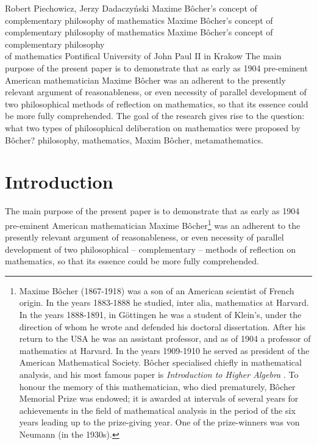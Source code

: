 \begin{artengenv}{Robert Piechowicz, Jerzy Dadaczyński}
	{Maxime Bôcher's concept of complementary philosophy of mathematics}
	{Maxime Bôcher's concept of complementary philosophy of mathematics}
	{Maxime Bôcher's concept of complementary philosophy\\of mathematics}
	{Pontifical University of John Paul II in Krakow}
	{The main purpose of the present paper is to demonstrate that as early as 1904 pre-eminent American mathematician Maxime Bôcher was an adherent to the presently relevant argument of reasonableness, or even necessity of parallel development of two philosophical methods of reflection on mathematics, so that its essence could be more fully comprehended. The goal of the research gives rise to the question: what two types of philosophical deliberation on mathematics were proposed by Bôcher?}
	{philosophy, mathematics, Maxim Bôcher, metamathematics.}
	




\section{Introduction}
The main purpose of the present paper is to demonstrate that as early as 1904 pre-eminent American mathematician Maxime Bôcher\footnote{Maxime Bôcher (1867-1918) was a son of an American scientist of French origin. In the years 1883-1888 he studied, inter alia, mathematics at Harvard. In the years 1888-1891, in Göttingen he was a student of Klein's, under the direction of whom he wrote and defended his doctoral dissertation. After his return to the USA he was an assistant professor, and as of 1904 a professor of mathematics at Harvard. In the years 1909-1910 he served as president of the American Mathematical Society. Bôcher specialised chiefly in mathematical analysis, and his most famous paper is \textit{Introduction to Higher Algebra}
\parencite[][]{bocher_introduction_1907}.
To honour the memory of this mathematician, who died prematurely, Bôcher Memorial Prize was endowed; it is awarded at intervals of several years for achievements in the field of mathematical analysis in the period of the six years leading up to the prize-giving year. One of the prize-winners was von Neumann (in the 1930s).} was an adherent to the presently relevant argument of reasonableness, or even necessity of parallel development of two philosophical -- complementary -- methods of reflection on mathematics, so that its essence could be more fully comprehended.


\end{artengenv}
